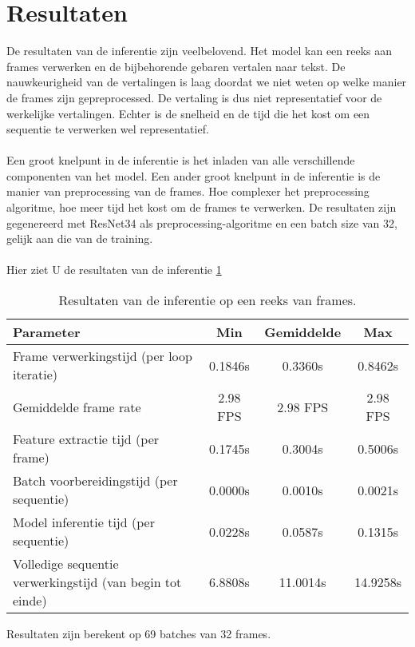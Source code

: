 \section{Resultaten}
\label{sec:inferentie-resultaten}
De resultaten van de inferentie zijn veelbelovend.
Het model kan een reeks aan frames verwerken en de bijbehorende gebaren vertalen naar tekst.
De nauwkeurigheid van de vertalingen is laag doordat we niet weten op welke manier de frames zijn gepreprocessed.
De vertaling is dus niet representatief voor de werkelijke vertalingen.
Echter is de snelheid en de tijd die het kost om een sequentie te verwerken wel representatief.
\\
\\
Een groot knelpunt in de inferentie is het inladen van alle verschillende componenten van het model.
Een ander groot knelpunt in de inferentie is de manier van preprocessing van de frames.
Hoe complexer het preprocessing algoritme, hoe meer tijd het kost om de frames te verwerken.
De resultaten zijn gegenereerd met ResNet34 als preprocessing-algoritme en een batch size van 32, gelijk aan die van de training.
\\
\\
Hier ziet U de resultaten van de inferentie \ref{tab:inferentie-resultaten}
\begin{table}
    \begin{tabular}{|l||c|c|c||}
        \hline
        \textbf{Parameter} & \textbf{Min} & \textbf{Gemiddelde} & \textbf{Max} \\
        \hline
        Frame verwerkingstijd (per loop iteratie) & 0.1846s & 0.3360s & 0.8462s \\
        \hline
        Gemiddelde frame rate & 2.98 FPS & 2.98 FPS & 2.98 FPS \\
        \hline
        Feature extractie tijd (per frame) & 0.1745s & 0.3004s & 0.5006s \\
        \hline
        Batch voorbereidingstijd (per sequentie) & 0.0000s & 0.0010s & 0.0021s \\
        \hline
        Model inferentie tijd (per sequentie) & 0.0228s & 0.0587s & 0.1315s \\
        \hline
        Volledige sequentie verwerkingstijd (van begin tot einde) & 6.8808s & 11.0014s & 14.9258s \\
        \hline
    \end{tabular}
    \caption{Resultaten van de inferentie op een reeks van frames.}
    \label{tab:inferentie-resultaten}
    \vspace{1mm}
    {\tiny Resultaten zijn berekent op 69 batches van 32 frames.}
\end{table}

